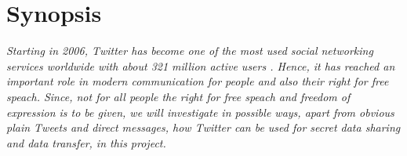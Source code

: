 \section*{Synopsis}
\label{s:synopsis}
\textit{Starting in 2006, Twitter has become one of the most used social networking services worldwide with about 321 million active users \cite{WikiTwitter}. Hence, it has reached an important role in modern communication for people and also their right for free speach. Since, not for all people the right for free speach and freedom of expression is to be given, we will investigate in possible ways, apart from obvious plain Tweets and direct messages, how Twitter can be used for secret data sharing and data transfer, in this project.}
\newpage
\nocite{*}
%



